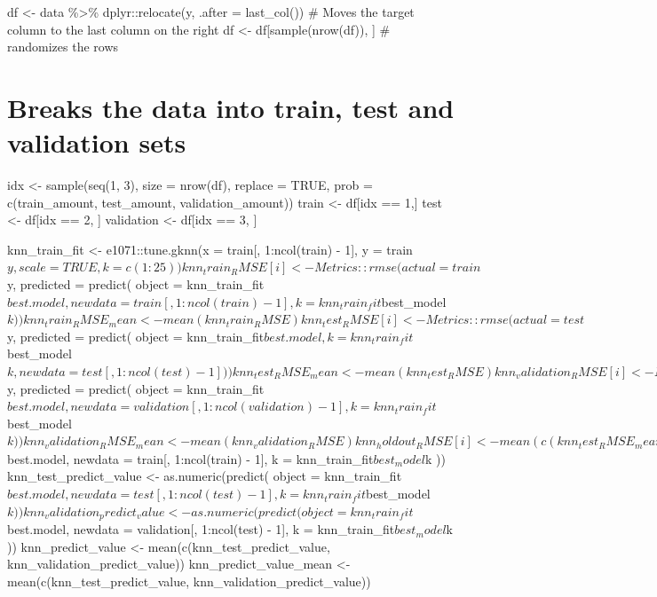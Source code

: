\documentclass[
]{book}
\begin{document}
df \textless- data \%\textgreater\% dplyr::relocate(y, .after = last\_col()) \# Moves the
target column to the last column on the right df \textless-
df{[}sample(nrow(df)), {]} \# randomizes the rows

\chapter{Breaks the data into train, test and validation sets}\label{breaks-the-data-into-train-test-and-validation-sets-6}

idx \textless- sample(seq(1, 3), size = nrow(df), replace = TRUE, prob =
c(train\_amount, test\_amount, validation\_amount)) train \textless- df{[}idx == 1,{]} test \textless- df{[}idx == 2, {]} validation \textless- df{[}idx == 3, {]}

knn\_train\_fit \textless- e1071::tune.gknn(x = train{[}, 1:ncol(train) - 1{]}, y =
train\(y, scale = TRUE, k = c(1:25))
knn_train_RMSE[i] <- Metrics::rmse(actual = train\)y, predicted =
predict( object = knn\_train\_fit\(best.model,
    newdata = train[, 1:ncol(train) - 1], k = knn_train_fit\)best\_model\(k
  ))
knn_train_RMSE_mean <- mean(knn_train_RMSE)
knn_test_RMSE[i] <- Metrics::rmse(actual = test\)y, predicted = predict(
object = knn\_train\_fit\(best.model,
    k = knn_train_fit\)best\_model\(k, newdata = test[, 1:ncol(test) - 1]
  ))
knn_test_RMSE_mean <- mean(knn_test_RMSE)
knn_validation_RMSE[i] <- Metrics::rmse(actual = validation\)y, predicted
= predict( object = knn\_train\_fit\(best.model,
    newdata = validation[, 1:ncol(validation) - 1], k = knn_train_fit\)best\_model\(k
  ))
knn_validation_RMSE_mean <- mean(knn_validation_RMSE)
knn_holdout_RMSE[i] <- mean(c(knn_test_RMSE_mean, knn_validation_RMSE_mean))
knn_holdout_RMSE_mean <- mean(knn_holdout_RMSE)
knn_holdout_RMSE_sd_mean <- sd(c(knn_test_RMSE_mean, knn_validation_RMSE_mean))
knn_train_predict_value <- as.numeric(predict(
    object = knn_train_fit\)best.model, newdata = train{[}, 1:ncol(train) -
1{]}, k = knn\_train\_fit\(best_model\)k )) knn\_test\_predict\_value \textless-
as.numeric(predict( object =
knn\_train\_fit\(best.model, newdata = test[, 1:ncol(test) - 1],
    k = knn_train_fit\)best\_model\(k
  ))
knn_validation_predict_value <- as.numeric(predict(
    object = knn_train_fit\)best.model, newdata = validation{[},
1:ncol(test) - 1{]}, k = knn\_train\_fit\(best_model\)k )) knn\_predict\_value
\textless- mean(c(knn\_test\_predict\_value, knn\_validation\_predict\_value))
knn\_predict\_value\_mean \textless- mean(c(knn\_test\_predict\_value,
knn\_validation\_predict\_value))
\end{document}
